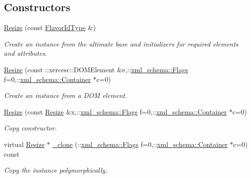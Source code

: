 \subsection*{Constructors}
\begin{DoxyCompactItemize}
\item 
\hypertarget{classopenstack_1_1xml_1_1Resize_a1404369c50dfc995c3f33953106ae59b}{
\hyperlink{classopenstack_1_1xml_1_1Resize_a1404369c50dfc995c3f33953106ae59b}{Resize} (const \hyperlink{classopenstack_1_1xml_1_1Resize_aa31a13a5db9fb12fb0be8b0dc79dc3f7}{FlavorIdType} \&)}
\label{classopenstack_1_1xml_1_1Resize_a1404369c50dfc995c3f33953106ae59b}

\begin{DoxyCompactList}\small\item\em Create an instance from the ultimate base and initializers for required elements and attributes. \item\end{DoxyCompactList}\item 
\hyperlink{classopenstack_1_1xml_1_1Resize_a5704cbf85e896cfe1b3f5b8b451d99a8}{Resize} (const ::xercesc::DOMElement \&e,::\hyperlink{namespacexml__schema_affb4c227cbd9aa7453dd1dc5a1401943}{xml\_\-schema::Flags} f=0,::\hyperlink{namespacexml__schema_a333dea2213742aea47a37532dec4ec27}{xml\_\-schema::Container} $\ast$c=0)
\begin{DoxyCompactList}\small\item\em Create an instance from a DOM element. \item\end{DoxyCompactList}\item 
\hyperlink{classopenstack_1_1xml_1_1Resize_a34d9ea12a552ee7ff98b13bbf5ce78d2}{Resize} (const \hyperlink{classopenstack_1_1xml_1_1Resize}{Resize} \&x,::\hyperlink{namespacexml__schema_affb4c227cbd9aa7453dd1dc5a1401943}{xml\_\-schema::Flags} f=0,::\hyperlink{namespacexml__schema_a333dea2213742aea47a37532dec4ec27}{xml\_\-schema::Container} $\ast$c=0)
\begin{DoxyCompactList}\small\item\em Copy constructor. \item\end{DoxyCompactList}\item 
virtual \hyperlink{classopenstack_1_1xml_1_1Resize}{Resize} $\ast$ \hyperlink{classopenstack_1_1xml_1_1Resize_a3dbc828999652c9f8fb318f5c8e17352}{\_\-clone} (::\hyperlink{namespacexml__schema_affb4c227cbd9aa7453dd1dc5a1401943}{xml\_\-schema::Flags} f=0,::\hyperlink{namespacexml__schema_a333dea2213742aea47a37532dec4ec27}{xml\_\-schema::Container} $\ast$c=0) const 
\begin{DoxyCompactList}\small\item\em Copy the instance polymorphically. \item\end{DoxyCompactList}\end{DoxyCompactItemize}


